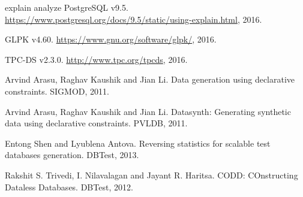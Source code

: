 \documentclass[]{article}
\begin{document}
\begin{multicols}{2}
\begin{thebibliography}{7}
explain analyze PostgreSQL v9.5. \url{https://www.postgresql.org/docs/9.5/static/using-explain.html}, 2016.

GLPK v4.60. \url{https://www.gnu.org/software/glpk/}, 2016.

TPC-DS v2.3.0. \url{http://www.tpc.org/tpcds}, 2016.

Arvind Arasu, Raghav Kaushik and Jian Li. Data generation using declarative constraints. SIGMOD, 2011.

Arvind Arasu, Raghav Kaushik and Jian Li. Datasynth: Generating synthetic data using declarative constraints. PVLDB, 2011.

Entong Shen and Lyublena Antova. Reversing statistics for scalable test databases generation. DBTest, 2013.

Rakshit S. Trivedi, I. Nilavalagan and Jayant R. Haritsa. CODD:  COnstructing Dataless Databases. DBTest, 2012.

\end{thebibliography}
	
\end{multicols}
\end{document}
